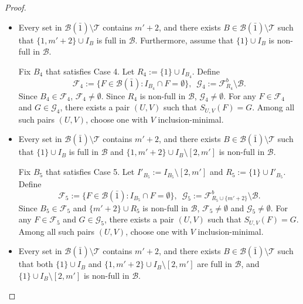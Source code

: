 \documentclass[10pt,a4paper]{amsart}
\newcommand{\m}{\mathcal}
\begin{document}
\begin{proof}
\begin{itemize}
\item[Case 4.] Every set in $\m B(\bar{1})\setminus \m T$ contains $m'+2$, and there exists $B\in \m B(\bar{1})\setminus \m T$
such that $\{1,m'+2\}\cup I_B$ is full in $\m B$. 
Furthermore, assume that $\{1\}\cup I_{B}$ is non-full in $\m B$.

Fix $B_4$ that satisfies Case 4. 
Let $R_4:=\{1\}\cup I_{B_4}$. 
Define
\begin{equation*}
    \m F_4:=\{F\in \m B(\bar1): I_{B_4}\cap F=\emptyset\}, \,\,\,
    \m G_4:=\m F_{{R_4}}^b\setminus \m B.
\end{equation*}
Since $B_4\in \m F_4$, $\m F_4\ne \emptyset$.  
Since $R_4$ is non-full in $\m B$,  $\m G_4\ne \emptyset$.
For any $F\in \m F_4$ and $G\in \m G_4$, there exists a pair $(U,V)$ such that $S_{U,V}(F)=G$. Among all such pairs $(U,V)$, choose one with $V$ inclusion-minimal.

\item[Case 5.] Every set in $\m B(\bar{1})\setminus \m T$ contains $m'+2$, and there exists $B\in \m B(\bar{1})\setminus \m T$ such that $\{1\}\cup I_{B}$ is full in $\m B$ and
$\{1,m'+2\}\cup I_{B}\setminus [2,m']$ is non-full in $\m B$.

Fix $B_5$ that satisfies Case 5. 
Let $I'_{B_5}:=I_{B_5}\setminus [2,m']$ and $R_5:=\{1\}\cup I'_{B_5}$.
Define
\begin{equation*}
    \m F_5:=\{F\in \m B(\bar1): I_{B_5}\cap F=\emptyset\}, \,\,\,
    \m G_5:=\m F_{R_5\cup \{m'+2\}}^b\setminus \m B.
\end{equation*}
Since $B_5\in \m F_5$ and $\{m'+2\}\cup R_5$ is non-full in $\m B$, $\m F_5\ne \emptyset$ and $\m G_5\ne \emptyset$. 
For any $F\in \m F_5$ and $G\in \m G_5$, there exists a pair $(U,V)$ such that $S_{U,V}(F)=G$. Among all such pairs $(U,V)$, choose one with $V$ inclusion-minimal.


\item[Case 6.] Every set in $\m B(\bar{1})\setminus \m T$ contains $m'+2$, and there exists $B\in \m B(\bar{1})\setminus \m T$ such that both $\{1\}\cup I_{B}$ and
$\{1,m'+2\}\cup I_{B}\setminus [2,m']$ are full in $\m B$, and $\{1\}\cup I_{B}\setminus [2,m']$ is non-full in $\m B$.


\end{itemize}
\end{proof}
\end{document}
